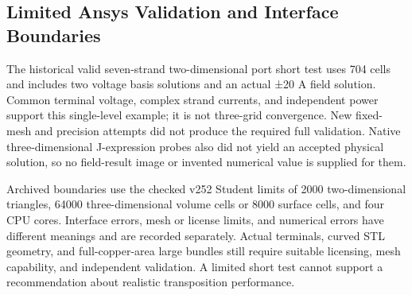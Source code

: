 \documentclass[11pt]{article}
\begin{document}
\subsection*{Limited Ansys Validation and Interface Boundaries}
\hypertarget{S2.ansys.heading}{}
The historical valid seven-strand two-dimensional port short test uses 704 cells and includes two voltage basis solutions and an actual ±20 A field solution. Common terminal voltage, complex strand currents, and independent power support this single-level example; it is not three-grid convergence. New fixed-mesh and precision attempts did not produce the required full validation. Native three-dimensional J-expression probes also did not yield an accepted physical solution, so no field-result image or invented numerical value is supplied for them.


Archived boundaries use the checked v252 Student limits of 2000 two-dimensional triangles, 64000 three-dimensional volume cells or 8000 surface cells, and four CPU cores. Interface errors, mesh or license limits, and numerical errors have different meanings and are recorded separately. Actual terminals, curved STL geometry, and full-copper-area large bundles still require suitable licensing, mesh capability, and independent validation. A limited short test cannot support a recommendation about realistic transposition performance.
\end{document}
